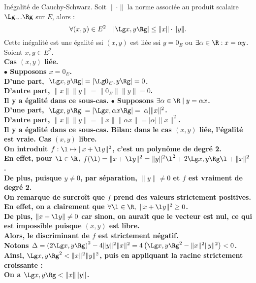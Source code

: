 \documentclass[11pt]{article}
\begin{document}
\begin{thm}{Inégalité de Cauchy-Schwarz.}{}
    Soit $\|\cdot\|$ la norme associée au produit scalaire $\Lg.,.\Rg$ sur $E$, alors :
    \begin{equation*}
        \forall (x,y)\in E^2 \quad |\Lg x, y \Rg|\leq \|x\|\cdot\|y\|.
    \end{equation*}
    Cette inégalité est une égalité ssi $(x,y)$ est liée ssi $y=0_E$ ou $\exists\alpha\in\R:x=\alpha y$.
    \tcblower
    Soient $x,y\in E^2$.\\
    \bf{Cas $(x,y)$ liée}.\\
    $\bullet$ Supposons $x=0_E$.\\
    D'une part, $|\Lg x,y\Rg|=|\Lg0_E,y\Rg|=0$.\\
    D'autre part, $\|x\|\|y\|=\|0_E\|\|y\|=0$.\\
    Il y a égalité dans ce sous-cas.\n
    $\bullet$ Supposons $\exists \alpha\in\R \mid y = \alpha x$.\\
    D'une part, $|\Lg x,y\Rg|=|\Lg x, \alpha x \Rg|=|\alpha|\|x\|^2$.\\
    D'autre part, $\|x\|\|y\|=\|x\|\|\alpha x\|=|\alpha|\|x\|^2$.\\
    Il y a égalité dans ce sous-cas.\n
    \bf{Bilan:} dans le cas $(x,y)$ liée, l'égalité est vraie.\n
    \bf{Cas $(x,y)$ libre}.\\
    On introduit $f:\l\mapsto\|x+\l y\|^2$, c'est un polynôme de degré 2.\\
    En effet, pour $\l\in\R$, $f(\l)=\|x+\l y\|^2=\|y\|^2\l^2+2\Lg x, y \Rg\l + \|x\|^2$.\\
    De plus, puisque $y\neq0$, par séparation, $\|y\|\neq0$ et $f$ est vraiment de degré 2.\\
    On remarque de surcroît que $f$ prend des valeurs strictement positives.\\
    En effet, on a clairement que $\forall \l\in\R, ~ \|x+\l y\|^2\geq0$.\\
    De plus, $\|x+\l y\|\neq0$ car sinon, on aurait que le vecteur est nul, ce qui est impossible puisque $(x,y)$ est libre.\\
    Alors, le discriminant de $f$ est strictement négatif.\\
    Notons $\Delta=\left( 2\Lg x,y\Rg \right)^2-4\|y\|^2\|x\|^2=4\left( \Lg x, y \Rg^2 - \|x\|^2\|y\|^2 \right)<0$.\\
    Ainsi, $\Lg x, y \Rg^2 < \|x\|^2\|y\|^2$, puis en appliquant la racine strictement croissante :\\
    \bf{On a $\Lg x, y \Rg < \|x\|\|y\|$.}
\end{thm}
\end{document}
